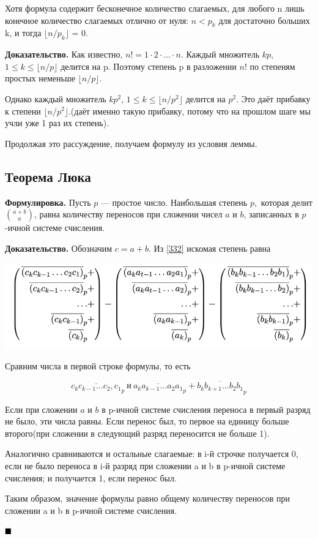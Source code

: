 \documentclass[a4paper, 10pt]{article}
\begin{document}
Хотя формула содержит бесконечное количество слагаемых, для любого n лишь конечное количество слагаемых отлично от нуля: $n < p_k$ для достаточно больших k, и тогда $\lfloor n / p_k \rfloor$ = 0.

\textbf{Доказательство.} Как известно, $n! = 1 \cdot 2 \cdot \dots \cdot n$. Каждый множитель $kp$, $1 \leqslant k \leqslant \lfloor n/p \rfloor$ делится на p. Поэтому степень p в разложении $n!$ по степеням простых неменьше $\lfloor n/p \rfloor$.

Однако каждый множитель $kp^2$, $1 \leqslant k \leqslant \lfloor n/p^2 \rfloor$ делится на $p^2$. Это даёт прибавку к степени $\lfloor n/p^2 \rfloor$.(даёт именно такую прибавку, потому что на прошлом шаге мы учли уже 1 раз их степень).

Продолжая это рассуждение, получаем формулу из условия леммы.


\subsection{Теорема Люка}

\textbf{Формулировка.} Пусть $p$ — простое число. Наибольшая степень $p,$ которая делит $\binom{a + b}{a}$, равна количеству переносов при сложении чисел $a$ и $b$, записанных в $p$-ичной системе счисления.

\textbf{Доказательство.} Обозначим $c = a + b$. Из \ref{332} искомая степень равна

\includegraphics[scale=0.45]{luca.png}

Сравним числа в первой строке формулы, то есть

$$\overline{c_k c_{k - 1}\dots c_2, c_1}_p \ \textit{и} \ \overline{a_k a_{k - 1} \dots a_2 a_1}_p + \overline{b_k b_{k + 1} \dots b_2 b_1}_p$$

Если при сложении $a$ и $b$ в p-ичной системе счисления переноса в первый разряд не было, эти числа равны. Если перенос был, то первое на единицу больше второго(при сложении в следующий разряд переносится не больше 1).

Аналогично сравниваются и остальные слагаемые: в i-й строчке получается 0, если не было переноса в i-й разряд при сложении a и b в p-ичной системе счисления; и получается 1, если перенос был.

Таким образом, значение формулы равно общему количеству переносов при сложении a и b в p-ичной системе счисления.

$\hfill \blacksquare$

\begin{center}
	\Cat[20]
\end{center}
\end{document}

